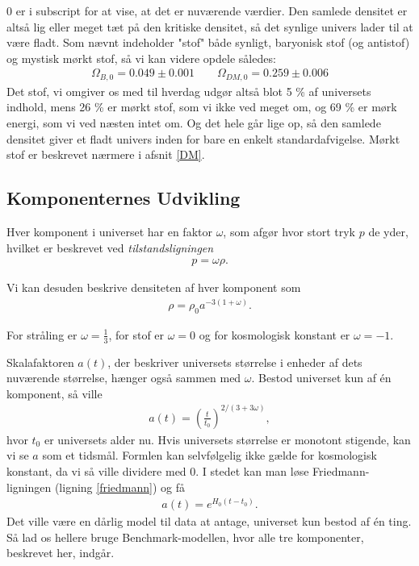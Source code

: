 0 er i subscript for at vise, at det er nuværende værdier. Den samlede densitet er altså lig eller meget tæt på den kritiske densitet, så det synlige univers lader til at være fladt. Som nævnt indeholder "stof" både synligt, baryonisk stof (og antistof) og mystisk mørkt stof, så vi kan videre opdele således:
\begin{align}
\Omega_{B,0}=0.049\pm 0.001\qquad
\Omega_{DM,0}=0.259\pm 0.006
\end{align}
Det stof, vi omgiver os med til hverdag udgør altså blot 5 \% af universets indhold, mens 26 \% er mørkt stof, som vi ikke ved meget om, og 69 \% er mørk energi, som vi ved næsten intet om. Og det hele går lige op, så den samlede densitet giver et fladt univers inden for bare en enkelt standardafvigelse. Mørkt stof er beskrevet nærmere i afsnit \ref{DM}.

\subsection{Komponenternes Udvikling}
Hver komponent i universet har en faktor $\omega$, som afgør hvor stort tryk $p$ de yder, hvilket er beskrevet ved \emph{tilstandsligningen}
\begin{align}
p=\omega \rho.
\end{align}

Vi kan desuden beskrive densiteten af hver komponent som
\begin{align}
\rho = \rho_0 a^{-3(1+\omega)}. \label{density}
\end{align}

For stråling er $\omega=\frac{1}{3}$, for stof er $\omega=0$ og for kosmologisk konstant er $\omega=-1$.


Skalafaktoren $a(t)$, der beskriver universets størrelse i enheder af dets nuværende størrelse, hænger også sammen med $\omega$. Bestod universet kun af én komponent, så ville
\begin{align}
a(t)=\left(\frac{t}{t_0}\right)^{2/(3+3\omega)},
\end{align}
hvor $t_0$ er universets alder nu. Hvis universets størrelse er monotont stigende, kan vi se $a$ som et tidsmål. Formlen kan selvfølgelig ikke gælde for kosmologisk konstant, da vi så ville dividere med 0. I stedet kan man løse Friedmann-ligningen (ligning \ref{friedmann}) og få
\begin{align}
	a(t)=e^{H_0(t-t_0)}.
\end{align}
Det ville være en dårlig model til data at antage, universet kun bestod af én ting. Så lad os hellere bruge Benchmark-modellen, hvor alle tre komponenter, beskrevet her, indgår.

